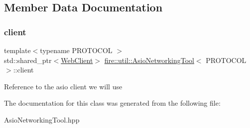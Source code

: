 \subsection{Member Data Documentation}
\mbox{\label{a01968_a57412dca950e86b857ee4795a9b6517e}} 
\subsubsection{\texorpdfstring{client}{client}}
{\footnotesize\ttfamily template$<$typename P\+R\+O\+T\+O\+C\+OL $>$ \\
std\+::shared\+\_\+ptr$<$\hyperlink{a01908}{Web\+Client}$>$ \hyperlink{a01968}{fire\+::util\+::\+Asio\+Networking\+Tool}$<$ P\+R\+O\+T\+O\+C\+OL $>$\+::client\hspace{0.3cm}{\ttfamily [protected]}}

Reference to the asio client we will use 

The documentation for this class was generated from the following file\+:\begin{DoxyCompactItemize}
\item 
Asio\+Networking\+Tool.\+hpp\end{DoxyCompactItemize}
